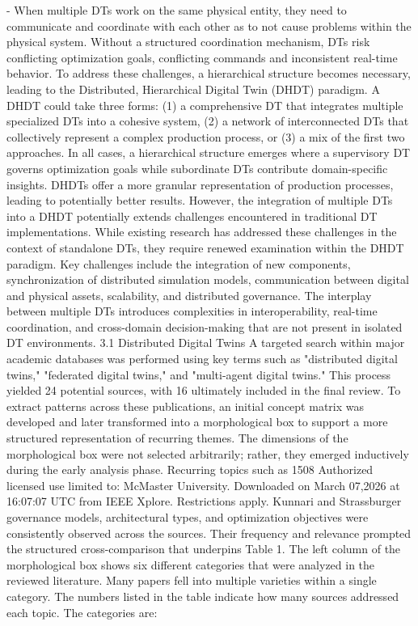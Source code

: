 \cite{kunnari2025distributed} - When multiple DTs work on the same physical entity, they need to communicate and coordinate with
each other as to not cause problems within the physical system. Without a structured coordination
mechanism, DTs risk conflicting optimization goals, conflicting commands and inconsistent real-time
behavior. To address these challenges, a hierarchical structure becomes necessary, leading to the
Distributed, Hierarchical Digital Twin (DHDT) paradigm. A DHDT could take three forms: (1) a
comprehensive DT that integrates multiple specialized DTs into a cohesive system, (2) a network of
interconnected DTs that collectively represent a complex production process, or (3) a mix of the first two
approaches. In all cases, a hierarchical structure emerges where a supervisory DT governs optimization
goals while subordinate DTs contribute domain-specific insights. DHDTs offer a more granular
representation of production processes, leading to potentially better results.
However, the integration of multiple DTs into a DHDT potentially extends challenges encountered in
traditional DT implementations. While existing research has addressed these challenges in the context of
standalone DTs, they require renewed examination within the DHDT paradigm. Key challenges include
the integration of new components, synchronization of distributed simulation models, communication
between digital and physical assets, scalability, and distributed governance. The interplay between
multiple DTs introduces complexities in interoperability, real-time coordination, and cross-domain
decision-making that are not present in isolated DT environments.
3.1 Distributed Digital Twins
A targeted search within major academic databases was performed using key terms such as "distributed
digital twins," "federated digital twins," and "multi-agent digital twins." This process yielded 24 potential
sources, with 16 ultimately included in the final review. To extract patterns across these publications, an
initial concept matrix was developed and later transformed into a morphological box to support a more
structured representation of recurring themes. The dimensions of the morphological box were not selected
arbitrarily; rather, they emerged inductively during the early analysis phase. Recurring topics such as
1508
Authorized licensed use limited to: McMaster University. Downloaded on March 07,2026 at 16:07:07 UTC from IEEE Xplore. Restrictions apply.
Kunnari and Strassburger
governance models, architectural types, and optimization objectives were consistently observed across the
sources. Their frequency and relevance prompted the structured cross-comparison that underpins Table 1.
The left column of the morphological box shows six different categories that were analyzed in the
reviewed literature. Many papers fell into multiple varieties within a single category. The numbers listed
in the table indicate how many sources addressed each topic. The categories are:

